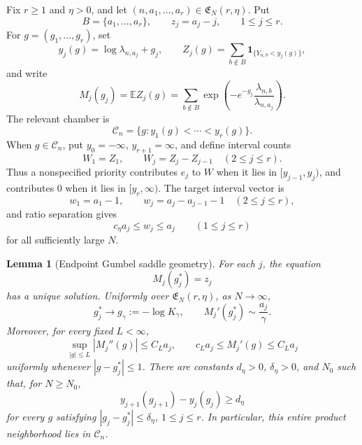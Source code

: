 \documentclass[11pt]{article}
\newtheorem{lemma}[theorem]{Lemma}
\theoremstyle{remark}
\newcommand{\Ee}{\mathbb E}
\newcommand{\one}{\mathbf 1}
\begin{document}
Fix \(r\ge1\) and \(\eta>0\), and let
\((n,a_1,\ldots,a_r)\in\mathfrak E_N(r,\eta)\).  Put
\[
        B=\{a_1,\ldots,a_r\},
        \qquad z_j=a_j-j,
        \qquad 1\le j\le r.
\]
For \(g=(g_1,\ldots,g_r)\), set
\[
        y_j(g)=\log\lambda_{n,a_j}+g_j,
        \qquad
        Z_j(g)=\sum_{b\notin B}
        \one_{\{Y_{n,b}<y_j(g)\}},
\]
and write
\[
        M_j(g_j)=\Ee Z_j(g)
        =\sum_{b\notin B}
        \exp\left(-e^{-g_j}
        \frac{\lambda_{n,b}}{\lambda_{n,a_j}}\right).
\]
The relevant chamber is
\[
        \mathscr C_n=\{g:y_1(g)<\cdots<y_r(g)\}.
\]
When \(g\in\mathscr C_n\), put \(y_0=-\infty\),
\(y_{r+1}=\infty\), and define interval counts
\[
        W_1=Z_1,
        \qquad W_j=Z_j-Z_{j-1}\quad(2\le j\le r).
\]
Thus a nonspecified priority contributes \(e_j\) to \(W\) when it lies in
\([y_{j-1},y_j)\), and contributes \(0\) when it lies in
\([y_r,\infty)\).  The target interval vector is
\[
        w_1=a_1-1,
        \qquad
        w_j=a_j-a_{j-1}-1\quad(2\le j\le r),
\]
and ratio separation gives
\[
        c_\eta a_j\le w_j\le a_j
        \qquad(1\le j\le r)
\tag{8.5}\label{eq:endpoint-interval-target-scale}
\]
for all sufficiently large \(N\).
\begin{lemma}[Endpoint Gumbel saddle geometry]
\label{lem:endpoint-gumbel-saddle}
For each \(j\), the equation
\[
        M_j(g_j^*)=z_j
\]
has a unique solution.  Uniformly over
\(\mathfrak E_N(r,\eta)\), as \(N\to\infty\),
\[
        g_j^*\longrightarrow g_\gamma:=-\log K_\gamma,
        \qquad
        M_j'(g_j^*)\sim\frac{a_j}{\gamma}.
\tag{8.6}\label{eq:endpoint-saddle-asymptotics}
\]
Moreover, for every fixed \(L<\infty\),
\[
        \sup_{|g|\le L}|M_j''(g)|\le C_La_j,
        \qquad
        c_La_j\le M_j'(g)\le C_La_j
\tag{8.7}\label{eq:endpoint-mean-derivative-bounds}
\]
uniformly whenever \(|g-g_j^*|\le1\).  There are constants
\(d_\eta>0\), \(\delta_\eta>0\), and \(N_0\) such that, for
\(N\ge N_0\),
\[
        y_{j+1}(g_{j+1})-y_j(g_j)\ge d_\eta
\tag{8.8}\label{eq:endpoint-threshold-gap}
\]
for every \(g\) satisfying
\(|g_j-g_j^*|\le\delta_\eta\), \(1\le j\le r\).  In particular, this
entire product neighborhood lies in \(\mathscr C_n\).
\end{lemma}
\end{document}
